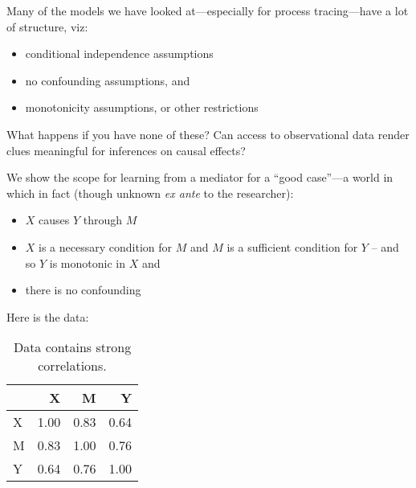 \documentclass[
  12pt,
]{book}
\newenvironment{Shaded}{\begin{snugshade}}{\end{snugshade}}
\newcommand{\DataTypeTok}[1]{\textcolor[rgb]{0.13,0.29,0.53}{#1}}
\newcommand{\DecValTok}[1]{\textcolor[rgb]{0.00,0.00,0.81}{#1}}
\newcommand{\FloatTok}[1]{\textcolor[rgb]{0.00,0.00,0.81}{#1}}
\newcommand{\KeywordTok}[1]{\textcolor[rgb]{0.13,0.29,0.53}{\textbf{#1}}}
\newcommand{\NormalTok}[1]{#1}
\newcommand{\OperatorTok}[1]{\textcolor[rgb]{0.81,0.36,0.00}{\textbf{#1}}}
\newcommand{\StringTok}[1]{\textcolor[rgb]{0.31,0.60,0.02}{#1}}
\providecommand{\tightlist}{%
  \setlength{\itemsep}{0pt}\setlength{\parskip}{0pt}}
\begin{document}
Many of the models we have looked at---especially for process tracing---have a lot of structure, viz:

\begin{itemize}
\tightlist
\item
  conditional independence assumptions
\item
  no confounding assumptions, and
\item
  monotonicity assumptions, or other restrictions
\end{itemize}

What happens if you have none of these? Can access to observational data render clues meaningful for inferences on causal effects?

We show the scope for learning from a mediator for a ``good case''---a world in which in fact (though unknown \emph{ex ante} to the researcher):

\begin{itemize}
\tightlist
\item
  \(X\) causes \(Y\) through \(M\)
\item
  \(X\) is a necessary condition for \(M\) and \(M\) is a sufficient condition for \(Y\) -- and so \(Y\) is monotonic in \(X\) and
\item
  there is no confounding
\end{itemize}

Here is the data:

\begin{Shaded}
\end{Shaded}

\begin{table}

\caption{\label{tab:unnamed-chunk-106}Data contains strong correlations.}
\centering
\begin{tabular}[t]{l|r|r|r}
\hline
  & X & M & Y\\
\hline
X & 1.00 & 0.83 & 0.64\\
\hline
M & 0.83 & 1.00 & 0.76\\
\hline
Y & 0.64 & 0.76 & 1.00\\
\hline
\end{tabular}
\end{table}
\end{document}
